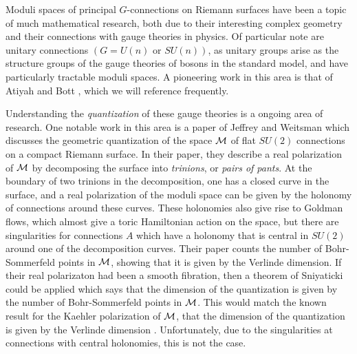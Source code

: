 

	Moduli spaces of principal $G$-connections on Riemann surfaces have been a topic of much mathematical research, both due to their interesting complex geometry and their connections with gauge theories in physics. Of particular note are unitary connections $(G=U(n) \text{ or }SU(n))$, as unitary groups arise as the structure groups of the gauge theories of bosons in the standard model, and have particularly tractable moduli spaces. A pioneering work in this area is that of Atiyah and Bott \cite{atiyah_yang-mills_1983}, which we will reference frequently. 
	
	Understanding the \emph{quantization} of these gauge theories is a ongoing area of research. One notable work in this area is a paper of Jeffrey and Weitsman \cite{jeffrey_bohr-sommerfeld_1992} which discusses the geometric quantization of the space $\mathcal{M}$ of flat $SU(2)$ connections on a compact Riemann surface. In their paper, they describe a real polarization of $\mathcal{M}$ by decomposing the surface into \textit{trinions}, or \textit{pairs of pants}. At the boundary of two trinions in the decomposition, one has a closed curve in the surface, and a real polarization of the moduli space can be given by the holonomy of connections around these curves. These holonomies also give rise to Goldman flows, which almost give a toric Hamiltonian action on the space, but there are singularities for connections $A$ which have a holonomy that is central in $SU(2)$ around one of the decomposition curves. Their paper counts the number of Bohr-Sommerfeld points in $\mathcal{M}$, showing that it is given by the Verlinde dimension. If their real polarizaton had been a smooth fibration, then a theorem of Sniyaticki could be applied which says that the dimension of the quantization is given by the number of Bohr-Sommerfeld points in $\mathcal{M}$. This would match the known result for the Kaehler polarization of $\mathcal{M}$, that the dimension of the quantization is given by the Verlinde dimension \cite{faltings_proof_1994}. Unfortunately, due to the singularities at connections with central holonomies, this is not the case.
	
